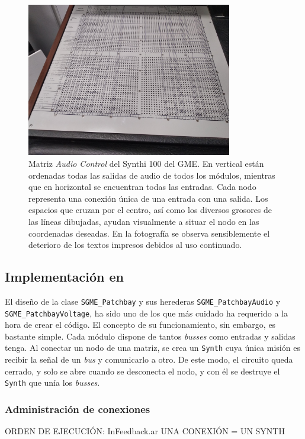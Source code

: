 \begin{figure}
	\centering
	\includegraphics[width=0.8\textwidth]{images/patchbay_audio_vista_gral}
	\caption[Matriz \textit{Audio Control} del Synthi 100 del GME]{Matriz \textit{Audio Control} del Synthi 100 del GME. En vertical están ordenadas todas las salidas de audio de todos los módulos, mientras que en horizontal se encuentran todas las entradas. Cada nodo representa una conexión única de una entrada con una salida. Los espacios que cruzan por el centro, así como los diversos grosores de las líneas dibujadas, ayudan visualmente a situar el nodo en las coordenadas deseadas. En la fotografía se observa sensiblemente el deterioro de los textos impresos debidos al uso continuado.}
	\label{fig:patchbay_audio_vista_gral}
\end{figure}

\subsection{Implementación en \appName}

El diseño de la clase \texttt{SGME\_Patchbay} y sus herederas \texttt{SGME\_PatchbayAudio} y \texttt{SGME\_PatchbayVoltage}, ha sido uno de los que más cuidado ha requerido a la hora de crear el código. El concepto de su funcionamiento, sin embargo, es bastante simple. Cada módulo dispone de tantos \textit{busses} como entradas y salidas tenga. Al conectar un nodo de una matriz, se crea un \texttt{Synth} cuya única misión es recibir la señal de un \textit{bus} y comunicarlo a otro. De este modo, el circuito queda cerrado, y solo se abre cuando se desconecta el nodo, y con él se destruye el \texttt{Synth} que unía los \textit{busses}.

\subsubsection[]{Administración de conexiones}
ORDEN DE EJECUCIÓN: InFeedback.ar
UNA CONEXIÓN = UN SYNTH

